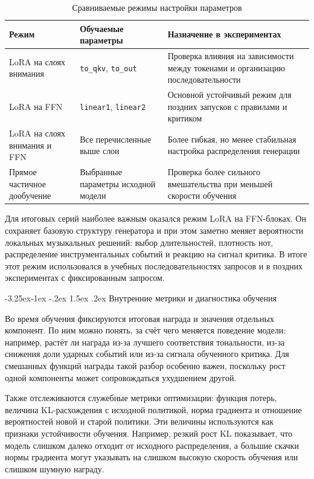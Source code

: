 \documentclass[a4paper,12pt]{extarticle}
\makeatletter
\renewcommand\subsection{\@startsection{subsection}{2}{\z@}%
  {-3.25ex\@plus -1ex \@minus -.2ex}%
  {1.5ex \@plus .2ex}%
  {\normalfont\large\bfseries\Needspace{6\baselineskip}}}
\makeatother
\begin{document}
\begin{table}[h]
\centering
\caption{Сравниваемые режимы настройки параметров}
\label{tab:adaptation-strategies}
\begin{tabular}{|p{}|p{}|p{}|}
\hline
\textbf{Режим} & \textbf{Обучаемые параметры} & \textbf{Назначение в экспериментах} \\
\hline
LoRA на слоях внимания & \texttt{to\_qkv}, \texttt{to\_out} &
Проверка влияния на зависимости между токенами и организацию последовательности \\
\hline
LoRA на FFN & \texttt{linear1}, \texttt{linear2} &
Основной устойчивый режим для поздних запусков с правилами и критиком \\
\hline
LoRA на слоях внимания и FFN & Все перечисленные выше слои &
Более гибкая, но менее стабильная настройка распределения генерации \\
\hline
Прямое частичное дообучение & Выбранные параметры исходной модели &
Проверка более сильного вмешательства при меньшей скорости обучения \\
\hline
\end{tabular}
\end{table}

Для итоговых серий наиболее важным оказался режим LoRA на FFN-блоках. Он
сохраняет базовую структуру генератора и при этом заметно меняет
вероятности локальных музыкальных решений: выбор длительностей, плотность нот,
распределение инструментальных событий и реакцию на сигнал критика. В итоге
этот режим использовался в учебных последовательностях запросов и в
поздних экспериментах с фиксированным запросом.

\subsection{Внутренние метрики и диагностика обучения}

Во время обучения фиксируются итоговая награда и значения отдельных
компонент. По ним можно понять, за счёт чего меняется поведение модели:
например, растёт ли награда из-за лучшего соответствия тональности, из-за
снижения доли ударных событий или из-за сигнала обученного критика. Для
смешанных функций награды такой разбор особенно важен, поскольку рост одной
компоненты может сопровождаться ухудшением другой.

Также отслеживаются служебные метрики оптимизации: функция потерь, величина
KL-расхождения с исходной политикой, норма градиента и отношение вероятностей
новой и старой политики. Эти величины используются как признаки устойчивости
обучения. Например, резкий рост KL показывает, что модель слишком далеко
отходит от исходного распределения, а большие скачки нормы градиента могут
указывать на слишком высокую скорость обучения или слишком шумную награду.
\end{document}
